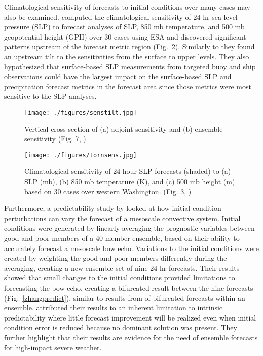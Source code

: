 \documentclass{ttuthes2007}
\newcommand{\tab}{\hspace*{2em}}  %
\begin{document}
\tab Climatological sensitivity of forecasts to initial conditions over many cases may also be examined. \cite{TornandHakim2008a} computed the climatological sensitivity of 24 hr sea level pressure (SLP) to forecast analyses of SLP, 850 mb temperature, and 500 mb geopotential height (GPH) over 30 cases using ESA and discovered significant patterns upstream of the forecast metric region (Fig.~\ref{tornsens}). Similarly to \cite{AncellandHakim2007a} they found an upstream tilt to the sensitivities from the surface to upper levels. They also hypothesized that surface-based SLP measurements from targeted buoy and ship observations could have the largest impact on the surface-based SLP and precipitation forecast metrics in the forecast area since those metrics were most sensitive to the SLP analyses. 

\begin{figure}[!htb]
  \centering
  \noindent\texttt{[image: ./figures/senstilt.jpg]}\\
  \caption{Vertical cross section of (a) adjoint sensitivity and (b) ensemble sensitivity (Fig. 7, \citealt{AncellandHakim2007a})}
\label{ancelltilt}
\end{figure}

\begin{figure}[!htb]
  \centering
  \noindent\texttt{[image: ./figures/tornsens.jpg]}\\
  \caption{Climatological sensitivity of 24 hour SLP forecasts (shaded) to (a) SLP (mb), (b) 850 mb temperature (K), and (c) 500 mb height (m) based on 30 cases over western Washington. (Fig. 3, \citealt{TornandHakim2008a})}
\label{tornsens}
\end{figure}

\tab Furthermore, a predictability study by \cite{MelhauserandZhang2012} looked at how initial condition perturbations can vary the forecast of a mesoscale convective system. Initial conditions were generated by linearly averaging the prognostic variables between good and poor members of a 40-member ensemble, based on their ability to accurately forecast a mesoscale bow echo. Variations to the initial conditions were created by weighting the good and poor members differently during the averaging, creating a new ensemble set of nine 24 hr forecasts. Their results showed that small changes to the initial conditions provided limitations to forecasting the bow echo, creating a bifurcated result between the nine forecasts (Fig.~\ref{zhangpredict}), similar to results from \cite{Hawblitzeletal2007} of bifurcated forecasts within an ensemble. \cite{MelhauserandZhang2012} attributed their results to an inherent limitation to intrinsic predictability where little forecast improvement will be realized even when initial condition error is reduced because no dominant solution was present. They further highlight that their results are evidence for the need of ensemble forecasts for high-impact severe weather.  
\end{document}

